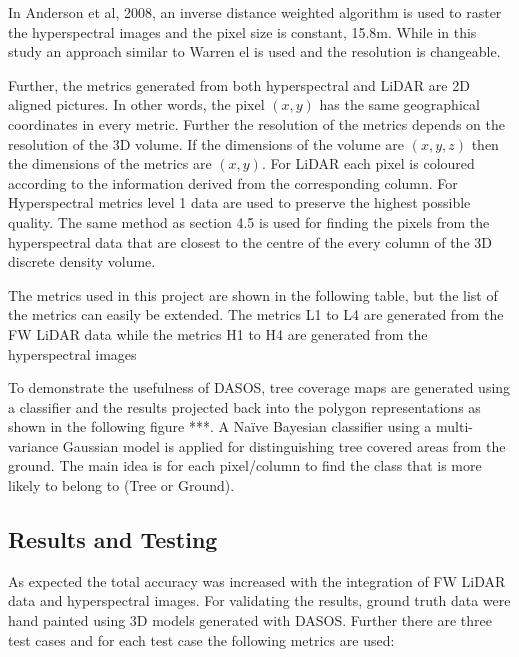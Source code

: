 \documentclass{subfiles}
\begin{document}
\par In Anderson et al, 2008, \cite{Anderson2008} an inverse distance weighted algorithm is used to raster the hyperspectral images and the pixel size is constant, 15.8m. While in this study an approach similar to Warren el \cite{Warren2014} is used and the resolution is changeable.

\par Further, the metrics generated from both hyperspectral and LiDAR are 2D aligned pictures. In other words, the pixel $(x, y)$ has the same geographical coordinates in every metric. Further the resolution of the metrics depends on the resolution of the 3D volume. If the dimensions of the volume are $(x, y, z)$ then the dimensions of the metrics are $(x, y)$. For LiDAR each pixel is coloured according to the information derived from the corresponding column. For Hyperspectral metrics level 1 data are used to preserve the highest possible quality. The same method as section 4.5 is used for finding the pixels from the hyperspectral data that are closest to the centre of the every column of the 3D discrete density volume.

\par The metrics used in this project are shown in the following table, but the list of the metrics can easily be extended. The metrics L1 to L4 are generated from the FW LiDAR data while the metrics H1 to H4 are generated from the hyperspectral images

\par To demonstrate the usefulness of DASOS, tree coverage maps are generated using a classifier and the results projected back into the polygon representations as shown in the following figure ***. A Naïve Bayesian classifier using a multi-variance Gaussian model is applied for distinguishing tree covered areas from the ground. The main idea is for each pixel/column to find the class
that is more likely to belong to (Tree or Ground).

\subsection{Results and Testing}
\par As expected the total accuracy was increased with the integration of FW LiDAR data and hyperspectral images. For validating the results, ground truth data were hand painted using 3D models generated with DASOS. Further there are three test cases and for each test case the following metrics are used:
\end{document}
